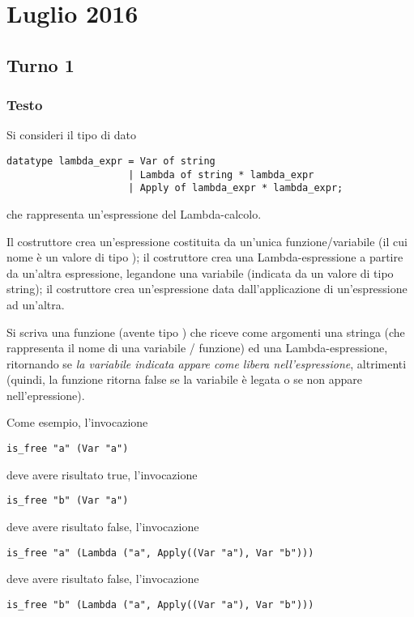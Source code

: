 \section{Luglio 2016}

\subsection{Turno 1}

\subsubsection{Testo}

Si consideri il tipo di dato
\begin{lstlisting}[style = SML, caption = {Definizione del tipo di dato \sml{espressione Lambda}}]
datatype lambda_expr = Var of string
					 | Lambda of string * lambda_expr
					 | Apply of lambda_expr * lambda_expr;
\end{lstlisting}
che rappresenta un'espressione del Lambda-calcolo.

\medskip
Il costruttore  crea un'espressione costituita da un'unica funzione/variabile (il cui nome è un valore di tipo );
il costruttore  crea una Lambda-espressione a partire da un'altra espressione, legandone una variabile (indicata da un valore di tipo string);
il costruttore  crea un'espressione data dall'applicazione di un'espressione ad un'altra.

\medskip
Si scriva una funzione  (avente tipo ) che riceve come argomenti una stringa (che rappresenta il nome di una variabile / funzione) ed una Lambda-espressione, %
ritornando  se \emph{la variabile indicata appare come libera nell'espressione}, %
 altrimenti (quindi, la funzione ritorna false se la variabile è legata o se non appare nell'epressione).

\medskip
Come esempio, l'invocazione
\begin{lstlisting}[style = SML]
is_free "a" (Var "a")
\end{lstlisting}
deve avere risultato true, l'invocazione
\begin{lstlisting}[style = SML]
is_free "b" (Var "a")
\end{lstlisting}
deve avere risultato false, l'invocazione
\begin{lstlisting}[style = SML]
is_free "a" (Lambda ("a", Apply((Var "a"), Var "b")))
\end{lstlisting}
deve avere risultato false, l'invocazione
\begin{lstlisting}[style = SML]
is_free "b" (Lambda ("a", Apply((Var "a"), Var "b")))
\end{lstlisting}

